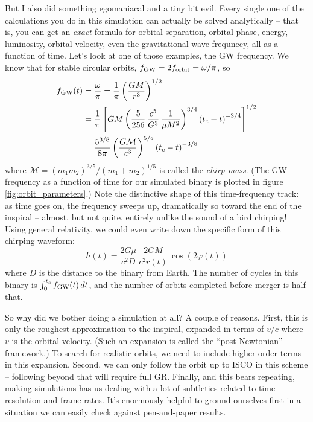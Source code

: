 \documentclass[11pt]{article}
\begin{document}
\begin{enumerate}
\hspace{15pt} But I also did something egomaniacal and a tiny bit evil. Every single one of the calculations you do in this simulation can actually be solved analytically -- that is, you can get an \emph{exact} formula for orbital separation, orbital phase, energy, luminosity, orbital velocity, even the gravitational wave frequnecy, all as a function of time. Let's look at one of those examples, the GW frequency. We know that for stable circular orbits, $f_{\rm GW} = 2 f_{\rm orbit} = \omega/\pi$, so
\begin{align*}
f_{\rm GW}(t) &= \frac{\omega}{\pi} = \frac{1}{\pi} \left( \frac{GM}{r^3} \right)^{1/2} \\
  &= \frac{1}{\pi} \left[ GM \left( \frac{5}{256} \, \frac{c^5}{G^3} \, \frac{1}{\mu M^2} \right)^{3/4} \left(t_c - t\right)^{-3/4} \right]^{1/2} \\
  &= \frac{5^{3/8}}{8\pi} \left( \frac{G\mathcal{M}}{c^3} \right)^{5/8} \left(t_c - t\right)^{-3/8}
\end{align*}
where $\mathcal{M} = (m_1 m_2)^{3/5}/(m_1 + m_2)^{1/5}$ is called the \textit{chirp mass}. (The GW frequency as a function of time for our simulated binary is plotted in figure \ref{fig:orbit_parameters}.) Note the distinctive shape of this time-frequency track: as time goes on, the frequency sweeps up, dramatically so toward the end of the inspiral -- almost, but not quite, entirely unlike the sound of a bird chirping! Using general relativity, we could even write down the specific form of this chirping waveform:
\begin{equation}
h(t) = \frac{2G\mu}{c^2D} \, \frac{2GM}{c^2r(t)} \, \cos\left(2\varphi(t)\right)
\end{equation}
where $D$ is the distance to the binary from Earth. The number of cycles in this binary is $\int_0^{t_c} f_{\rm GW}(t)\,dt$, and the number of orbits completed before merger is half that.

\hspace{15pt} So why did we bother doing a simulation at all? A couple of reasons. First, this is only the roughest approximation to the inspiral, expanded in terms of $v/c$ where $v$ is the orbital velocity. (Such an expansion is called the ``post-Newtonian'' framework.) To search for realistic orbits, we need to include higher-order terms in this expansion. Second, we can only follow the orbit up to ISCO in this scheme -- following beyond that will require full GR. Finally, and this bears repeating, making simulations has us dealing with a lot of subtleties related to time resolution and frame rates. It's enormously helpful to ground ourselves first in a situation we can easily check against pen-and-paper results.


\end{enumerate}
\end{document}
